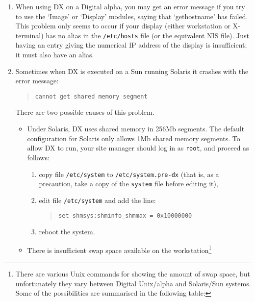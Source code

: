 \begin{enumerate}
  \item When using DX on a Digital alpha, you may get an error message if you
   try to use the `Image' or `Display' modules, saying that `gethostname'
   has failed. This problem only seems to occur if your display (either
   workstation or X-terminal) has no alias in the {\tt /etc/hosts} file 
   (or the equivalent NIS file). Just having an entry giving the numerical 
   IP address of the display is insufficient; it must also have an alias.

  \item Sometimes when DX is executed on a Sun running Solaris it crashes
   with the error message:

  \begin{quote}
   {\tt cannot get shared memory segment}
  \end{quote}

   There are two possible causes of this problem.

  \begin{itemize}

    \item Under Solaris, DX uses shared memory in 256Mb segments. 
     The default configuration for Solaris only allows 1Mb shared 
     memory segments.  To allow DX to run, your site manager should
     log in as {\tt root}, and proceed as follows:

    \begin{enumerate}

      \item copy file {\tt /etc/system} to {\tt /etc/system.pre-dx}
       (that is, as a precaution, take a copy of the {\tt system} file
       before editing it),

      \item edit file {\tt /etc/system} and add the line:
      \begin{quote}
       {\tt set shmsys:shminfo\_shmmax = 0x10000000}
      \end{quote}

      \item reboot the system.

    \end{enumerate}

    \pagebreak[4]
    \item There is insufficient swap space available on the 
     workstation\footnote{There are various Unix commands for showing
     the amount of swap space, but unfortunately they vary between
     Digital Unix/alpha and Solaris/Sun systems. Some of the possibilities
     are summarised in the following table:

}
\end{itemize}
\end{enumerate}
